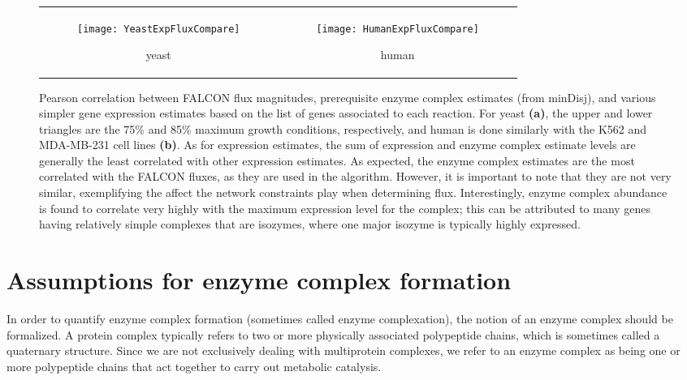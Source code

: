 
\begin{figure}[!htb]
\begin{tabular}{cc}
  \begin{subfigure}[b]{0.5\textwidth}   %
  \texttt{[image: YeastExpFluxCompare]}
  \caption{yeast} \label{fig:FluxExpCmp:A}
  \end{subfigure}
&
  \begin{subfigure}[b]{0.5\textwidth}
  \texttt{[image: HumanExpFluxCompare]}
  \caption{human} \label{fig:FluxExpCmp:B}
  \end{subfigure}
\\
\end{tabular}
\caption{Pearson correlation between FALCON flux magnitudes,
prerequisite enzyme complex estimates (from minDisj), and various
simpler gene expression estimates based on the list of genes
associated to each reaction. For yeast \textbf{(a)}, the upper and
lower triangles are the 75\% and 85\% maximum growth conditions,
respectively, and human is done similarly with the K562 and MDA-MB-231
cell lines \textbf{(b)}. As for expression estimates, the sum of
expression and enzyme complex estimate levels are generally the least
correlated with other expression estimates. As expected, the enzyme
complex estimates are the most correlated with the FALCON fluxes, as
they are used in the algorithm. However, it is important to note that
they are not very similar, exemplifying the affect the network
constraints play when determining flux. Interestingly, enzyme complex
abundance is found to correlate very highly with the maximum
expression level for the complex; this can be attributed to many genes
having relatively simple complexes that are isozymes, where one major
isozyme is typically highly expressed.}
\label{fig:FluxExpCmp}
\end{figure}
\FloatBarrier

\section{Assumptions for enzyme complex formation}
\label{sec:complexation}

In order to quantify enzyme complex formation (sometimes called enzyme
complexation), the notion of an enzyme complex should be formalized.
A protein complex typically refers to two or more physically
associated polypeptide chains, which is sometimes called a quaternary
structure. Since we are not exclusively dealing with multiprotein
complexes, we refer to an enzyme complex as being one or more
polypeptide chains that act together to carry out metabolic
catalysis.

